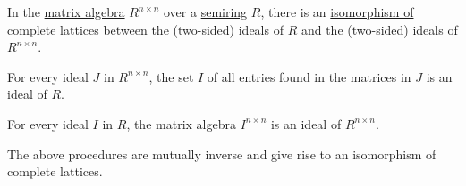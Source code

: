 \begin{proposition}\label{thm:matrix_algebra_ideals}
  In the \hyperref[thm:matrix_algebra]{matrix algebra} \( R^{n \times n} \) over a \hyperref[def:semiring]{semiring} \( R \), there is an \hyperref[def:lattice/homomorphism]{isomorphism of complete lattices} between the (two-sided) ideals of \( R \) and the (two-sided) ideals of \( R^{n \times n} \).

  \begin{thmenum}
     For every ideal \( J \) in \( R^{n \times n} \), the set \( I \) of all entries found in the matrices in \( J \) is an ideal of \( R \).

     For every ideal \( I \) in \( R \), the matrix algebra \( I^{n \times n} \) is an ideal of \( R^{n \times n} \).

     The above procedures are mutually inverse and give rise to an isomorphism of complete lattices.
  \end{thmenum}
\end{proposition}
